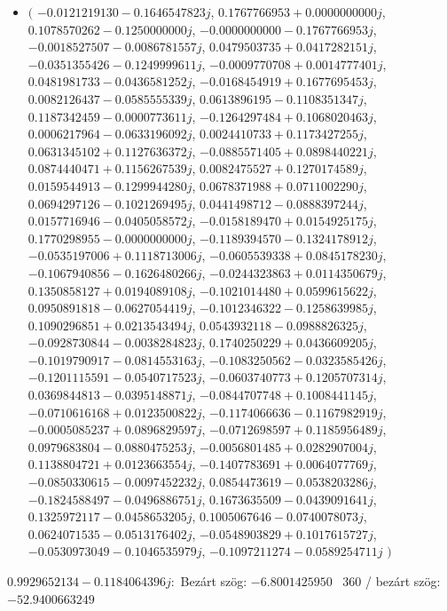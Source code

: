 \documentclass[14pt,a4paper]{article}
\begin{document}
\begin{itemize}
\item
$\big($
$-0.0121219130-0.1646547823j$, $0.1767766953+0.0000000000j$, $0.1078570262-0.1250000000j$, $-0.0000000000-0.1767766953j$, $-0.0018527507-0.0086781557j$, $0.0479503735+0.0417282151j$, $-0.0351355426-0.1249999611j$, $-0.0009770708+0.0014777401j$, $0.0481981733-0.0436581252j$, $-0.0168454919+0.1677695453j$, $0.0082126437-0.0585555339j$, $0.0613896195-0.1108351347j$, $0.1187342459-0.0000773611j$, $-0.1264297484+0.1068020463j$, $0.0006217964-0.0633196092j$, $0.0024410733+0.1173427255j$, $0.0631345102+0.1127636372j$, $-0.0885571405+0.0898440221j$, $0.0874440471+0.1156267539j$, $0.0082475527+0.1270174589j$, $0.0159544913-0.1299944280j$, $0.0678371988+0.0711002290j$, $0.0694297126-0.1021269495j$, $0.0441498712-0.0888397244j$, $0.0157716946-0.0405058572j$, $-0.0158189470+0.0154925175j$, $0.1770298955-0.0000000000j$, $-0.1189394570-0.1324178912j$, $-0.0535197006+0.1118713006j$, $-0.0605539338+0.0845178230j$, $-0.1067940856-0.1626480266j$, $-0.0244323863+0.0114350679j$, $0.1350858127+0.0194089108j$, $-0.1021014480+0.0599615622j$, $0.0950891818-0.0627054419j$, $-0.1012346322-0.1258639985j$, $0.1090296851+0.0213543494j$, $0.0543932118-0.0988826325j$, $-0.0928730844-0.0038284823j$, $0.1740250229+0.0436609205j$, $-0.1019790917-0.0814553163j$, $-0.1083250562-0.0323585426j$, $-0.1201115591-0.0540717523j$, $-0.0603740773+0.1205707314j$, $0.0369844813-0.0395148871j$, $-0.0844707748+0.1008441145j$, $-0.0710616168+0.0123500822j$, $-0.1174066636-0.1167982919j$, $-0.0005085237+0.0896829597j$, $-0.0712698597+0.1185956489j$, $0.0979683804-0.0880475253j$, $-0.0056801485+0.0282907004j$, $0.1138804721+0.0123663554j$, $-0.1407783691+0.0064077769j$, $-0.0850330615-0.0097452232j$, $0.0854473619-0.0538203286j$, $-0.1824588497-0.0496886751j$, $0.1673635509-0.0439091641j$, $0.1325972117-0.0458653205j$, $0.1005067646-0.0740078073j$, $0.0624071535-0.0513176402j$, $-0.0548903829+0.1017615727j$, $-0.0530973049-0.1046535979j$, $-0.1097211274-0.0589254711j$
$\big)$
\end{itemize}
$0.9929652134-0.1184064396j$:\
Bezárt szög: $-6.8001425950$ \
360 / bezárt szög: $-52.9400663249$\
\end{document}
